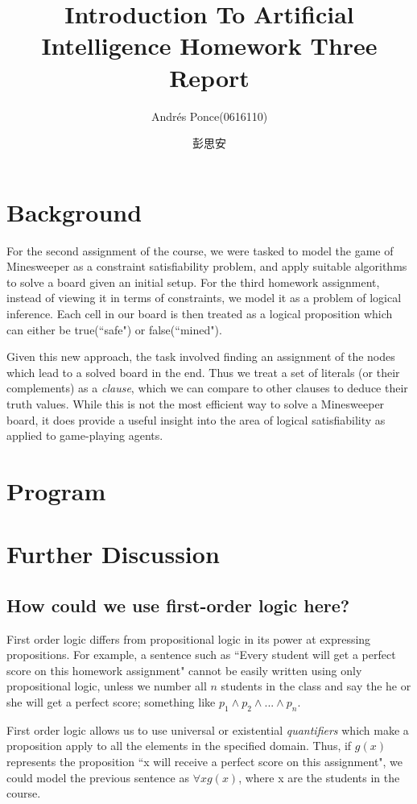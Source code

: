 \documentclass{article}
\author{Andr\'es Ponce(0616110)\\
\and
彭思安
}
\title{Introduction To Artificial Intelligence Homework Three Report}
\begin{document}
\maketitle
\section{Background}
For the second assignment of the course, we were tasked to model the game of Minesweeper as a 
constraint satisfiability problem, and apply suitable algorithms to solve a board given an initial 
setup. For the third homework assignment, instead of viewing it in terms of constraints, we model it
as a problem of logical inference. Each cell in our board is then treated as a logical proposition
which can either be true(``safe") or false(``mined").

Given this new approach, the task involved finding an assignment of the nodes which lead to a solved 
board in the end. Thus we treat a set of literals (or their complements) as a \textit{clause}, which
we can compare to other clauses to deduce their truth values. While this is not the most efficient
way to solve a Minesweeper board, it does provide a useful insight into the area of logical satisfiability
as applied to game-playing agents.

\section{Program}

\section{Further Discussion}
	\subsection{How could we use first-order logic here?}
		First order logic differs from propositional logic in its power at expressing propositions. For 
		example, a sentence such as ``Every student will get a perfect score on this homework assignment"
		cannot be easily written using only propositional logic, unless we number all $n$  students  in the
		class and say the he or she will get a perfect score; something like 
		$p_{1}\land p_{2}\land ...\land p_{n}$.
		
		First order logic allows us to use universal or existential \textit{quantifiers} which make a 
		proposition apply to all the elements in the specified domain. Thus, if $g(x)$ represents the 
		proposition ``x will receive a perfect score on this assignment", we could model the previous
		sentence as $\forall x g(x)$, where x are the students in the course.
	
\end{document}
